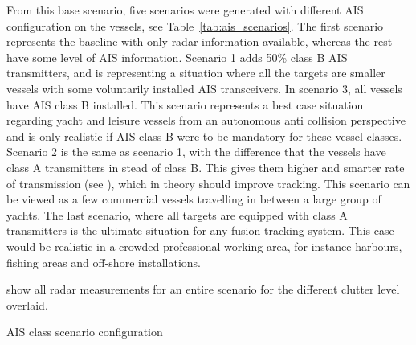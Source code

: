From this base scenario, five scenarios were generated with different AIS configuration on the vessels, see Table~\ref{tab:ais_scenarios}. The first scenario represents the baseline with only radar information available, whereas the rest have some level of AIS information. Scenario 1 adds 50\% class B AIS transmitters, and is representing a situation where all the targets are smaller vessels with some voluntarily installed AIS transceivers. In scenario 3, all vessels have AIS class B installed. This scenario represents a best case situation regarding yacht and leisure vessels from an autonomous anti collision perspective and is only realistic if AIS class B were to be mandatory for these vessel classes. Scenario 2 is the same as scenario 1, with the difference that the vessels have class A transmitters in stead of class B. This gives them higher and smarter rate of transmission (see ), which in theory should improve tracking. This scenario can be viewed as a few commercial vessels travelling in between a large group of yachts. The last scenario, where all targets are equipped with class A transmitters is the ultimate situation for any fusion tracking system. This case would be realistic in a crowded professional working area, for instance harbours, fishing areas and off-shore installations.

 show all radar measurements for an entire scenario for the different clutter level overlaid. 
\begin{table}
\centering
{}
\caption{AIS class scenario configuration}\label{tab:ais_scenarios}
\end{table}

